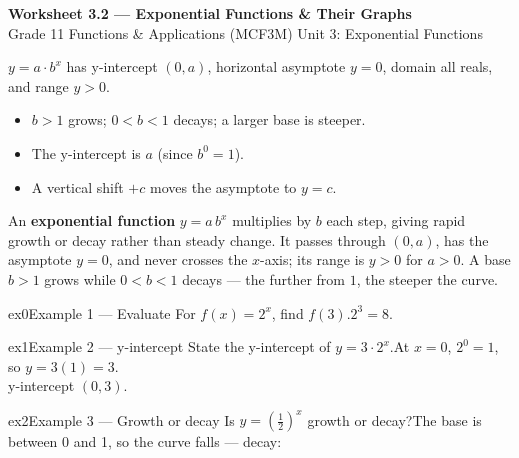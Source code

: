 \documentclass[11pt]{article}
\begin{document}
\begin{center}
{\LARGE\bfseries\color{titleblue}Worksheet 3.2 --- Exponential Functions \& Their Graphs}\\[2pt]
{\small Grade 11 Functions \& Applications (MCF3M) \textperiodcentered{} Unit 3: Exponential Functions}
\end{center}

\begin{ideabox}
$y=a\cdot b^x$ has y-intercept $(0,a)$, horizontal asymptote $y=0$, domain all reals, and range $y>0$.
\begin{itemize}[leftmargin=*,itemsep=2pt]
  \item $b>1$ grows; $0<b<1$ decays; a larger base is steeper.
  \item The y-intercept is $a$ (since $b^0=1$).
  \item A vertical shift $+c$ moves the asymptote to $y=c$.
\end{itemize}
\end{ideabox}

\begin{learnbox}
An \textbf{exponential function} $y=a\,b^x$ multiplies by $b$ each step, giving rapid growth or decay rather than steady change.
It passes through $(0,a)$, has the asymptote $y=0$, and never crosses the $x$-axis; its range is $y>0$ for $a>0$.
A base $b>1$ grows while $0<b<1$ decays — the further from $1$, the steeper the curve.
\end{learnbox}


\begin{example}{ex0}{Example 1 --- Evaluate}
For $f(x)=2^x$, find $f(3)$.\soln $2^3=8$.
\end{example}

\begin{example}{ex1}{Example 2 --- y-intercept}
State the y-intercept of $y=3\cdot2^x$.\soln At $x=0$, $2^0=1$, so $y=3(1)=3$. \\ y-intercept $(0,3)$.
\end{example}

\begin{example}{ex2}{Example 3 --- Growth or decay}
Is $y=\left(\tfrac12\right)^x$ growth or decay?\soln The base is between 0 and 1, so the curve falls — decay:
\end{example}
\end{document}
